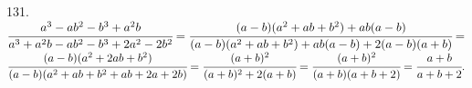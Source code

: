 131. $\cfrac{a^3-ab^2-b^3+a^2b}{a^3+a^2b-ab^2-b^3+2a^2-2b^2}=\cfrac{(a-b)(a^2+ab+b^2)+ab(a-b)}{(a-b)(a^2+ab+b^2)+ab(a-b)+2(a-b)(a+b)}=$\\$\cfrac{(a-b)(a^2+2ab+b^2)}{(a-b)(a^2+ab+b^2+
ab+2a+2b)}=\cfrac{(a+b)^2}{(a+b)^2+2(a+b)}=\cfrac{(a+b)^2}{(a+b)(a+b+2)}=\cfrac{a+b}{a+b+2}.$\\
